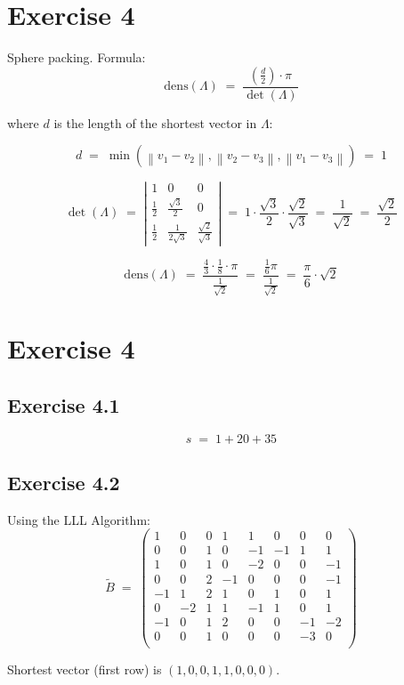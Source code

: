 \documentclass[a4paper]{scrreprt}
\newcommand{\norm}[1]{\left\lVert #1 \right\rVert}
\begin{document}
\section*{Exercise 4}

Sphere packing.  
Formula: \[\mathrm{dens}(\Lambda)\;=\;\frac{\left(\frac d2\right)\cdot\pi}{\det(\Lambda)}\]

where $d$ is the length of the shortest vector in $\Lambda$:

\[d\;=\;\min(\norm{v_1-v_2}, \norm{v_2-v_3}, \norm{v_1-v_3}) \;=\; 1\]

\[\det(\Lambda)\;=\;\left|\begin{matrix}1 & 0 & 0\\ \frac12 & \frac{\sqrt3}2 & 0\\
    \frac12 & \frac1{2\sqrt3} & \frac{\sqrt2}{\sqrt3}\end{matrix}\right|
    \;=\; 1\cdot\frac{\sqrt3}2\cdot\frac{\sqrt2}{\sqrt3}\;=\;\frac1{\sqrt2}\;=\;\frac{\sqrt2}2\]

\[\mathrm{dens}(\Lambda)\;=\;\frac{\frac43\cdot\frac18\cdot\pi}{\frac1{\sqrt2}}\;=\;
\frac{\frac16\pi}{\frac1{\sqrt2}}\;=\;\frac\pi6\cdot\sqrt2\]

\section*{Exercise 4}

\subsection*{Exercise 4.1}

\[s \;=\; 1 + 20 + 35\]

\subsection*{Exercise 4.2}

Using the LLL Algorithm:
\[\widetilde B\;=\;\begin{pmatrix}
1 & 0 & 0 & 1 & 1 & 0 & 0 & 0\\
0 & 0 & 1 & 0 & -1 & -1 & 1 & 1\\
1 & 0 & 1 & 0 & -2 & 0 & 0 & -1\\
0 & 0 & 2 & -1 & 0 & 0 & 0 & -1\\
-1 & 1 & 2 & 1 & 0 & 1 & 0 & 1\\
0 & -2 & 1 & 1 & -1 & 1 & 0 & 1\\
-1 & 0 & 1 & 2 & 0 & 0 & -1 & -2\\
0 & 0 & 1 & 0 & 0 & 0 & -3 & 0\\
\end{pmatrix}\]

Shortest vector (first row) is $(1, 0, 0, 1, 1, 0, 0, 0)$.
\end{document}
